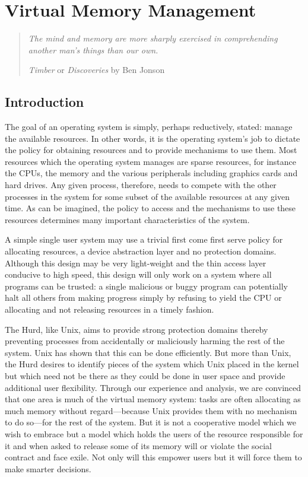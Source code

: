 \chapter{Virtual Memory Management}

\begin{quote}
\emph{The mind and memory are more sharply exercised in comprehending
another man's things than our own.}

\begin{flushright}
\emph{Timber} or \emph{Discoveries} by Ben Jonson
\end{flushright}
\end{quote}


\section{Introduction}

The goal of an operating system is simply, perhaps reductively,
stated: manage the available resources.  In other words, it is the
operating system's job to dictate the policy for obtaining resources
and to provide mechanisms to use them.  Most resources which the
operating system manages are sparse resources, for instance the CPUs,
the memory and the various peripherals including graphics cards and
hard drives.  Any given process, therefore, needs to compete with the
other processes in the system for some subset of the available
resources at any given time.  As can be imagined, the policy to access
and the mechanisms to use these resources determines many important
characteristics of the system.

A simple single user system may use a trivial first come first serve
policy for allocating resources, a device abstraction layer and no
protection domains.  Although this design may be very light-weight and
the thin access layer conducive to high speed, this design will only
work on a system where all programs can be trusted: a single malicious
or buggy program can potentially halt all others from making progress
simply by refusing to yield the CPU or allocating and not releasing
resources in a timely fashion.

The Hurd, like Unix, aims to provide strong protection domains thereby
preventing processes from accidentally or maliciously harming the rest
of the system.  Unix has shown that this can be done efficiently.  But
more than Unix, the Hurd desires to identify pieces of the system
which Unix placed in the kernel but which need not be there as they
could be done in user space and provide additional user flexibility.
Through our experience and analysis, we are convinced that one area is
much of the virtual memory system: tasks are often allocating as much
memory without regard---because Unix provides them with no mechanism
to do so---for the rest of the system.  But it is not a cooperative
model which we wish to embrace but a model which holds the users of
the resource responsible for it and when asked to release some of its
memory will or violate the social contract and face exile.  Not only
will this empower users but it will force them to make smarter
decisions.

